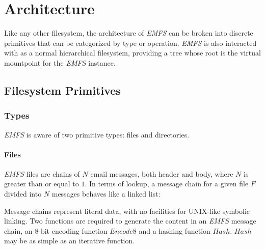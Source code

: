 \documentclass[12pt]{article}
\begin{document}
\section{Architecture}

Like any other filesystem, the architecture of \textit{EMFS} can be broken into
discrete primitives that can be categorized by type or operation.
\textit{EMFS} is also interacted with as a normal hierarchical filesystem,
providing a tree whose root is the virtual mountpoint for the \textit{EMFS}
instance.

\subsection{Filesystem Primitives}

\subsubsection{Types}

\textit{EMFS} is aware of two primitive types: files and directories.

\paragraph{Files}

\textit{EMFS} files are chains of $N$ email messages, both header and body,
where $N$ is greater than or equal to $1$. In terms of lookup, a message chain
for a given file $F$ divided into $N$ messages behaves like a linked list:


Message chains represent literal data, with no facilities for UNIX-like
symbolic linking. Two functions are required to generate the content in an
\textit{EMFS} message chain, an 8-bit encoding function $\mathit{Encode8}$ and a
hashing function $\mathit{Hash}$. $\mathit{Hash}$ may be as simple as an
iterative function.
\end{document}
